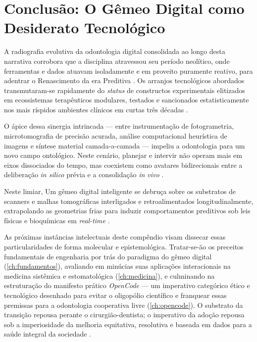 \section{Conclusão: O Gêmeo Digital como Desiderato Tecnológico}
\label{sec:panorama-conclusao}

A radiografia evolutiva da odontologia digital consolidada ao longo desta narrativa corrobora que a disciplina atravessou seu período neolítico, onde ferramentas e dados atuavam isoladamente e em proveito puramente reativo, para adentrar o Renascimento da era Preditiva \cite{techsoc2025precision}. Os arranjos tecnológicos abordados transmutaram-se rapidamente do \textit{status} de constructos experimentais elitizados em ecossistemas terapêuticos modulares, testados e sancionados estatisticamente nos mais ríspidos ambientes clínicos em curtas três décadas \cite{duggal2026exploring}.

O ápice dessa sinergia intrincada — entre instrumentação de fotogrametria, microtomografia de precisão acurada, análise computacional heurística de imagens e síntese material camada-a-camada — impeliu a odontologia para um novo campo ontológico. Neste cenário, planejar e intervir não operam mais em eixos dissociados do tempo, mas coexistem como avatares bidirecionais entre a deliberação \textit{in silico} prévia e a consolidação \textit{in vivo} \cite{katsoulakis2024digital, aisoc2026realising}.

Neste limiar,  Um gêmeo digital inteligente se debruça sobre os substratos de scanners e malhas tomográficas interligados e retroalimentados longitudinalmente, extrapolando as geometrias frias para induzir comportamentos preditivos sob leis físicas e bioquímicas em \textit{real-time} \cite{mdpi2025convergence}.

As próximas instâncias intelectuais deste compêndio visam dissecar essas particularidades de forma molecular e epistemológica. Tratar-se-ão os preceitos fundamentais de engenharia por trás do paradigma do gêmeo digital (\autoref{ch:fundamentos}), avaliando em minúcias suas aplicações interacionais na medicina sistêmica e estomatológica (\autoref{ch:medicina}), e culminando na estruturação do manifesto prático \textit{OpenCode} — um imperativo categórico ético e tecnológico desenhado para evitar o oligopólio científico e franquear essas premissas para a odontologia cooperativa livre (\autoref{ch:opencode}). O substrato da transição repousa perante o cirurgião-dentista; o imperativo da adoção repousa sob a imperiosidade da melhoria equitativa, resolutiva e baseada em dados para a saúde integral da sociedade \cite{olawade2026advancing}.
